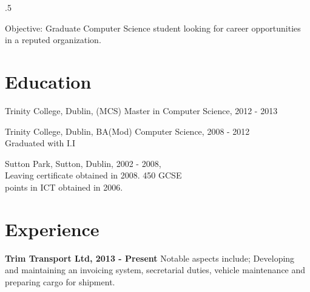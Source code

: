 \documentclass{res}
\begin{document}
 

\thispagestyle{empty} %
\pagestyle{empty}
\address{14 Strand Road\\
Sutton\\
Dublin 13\\
00 353 86 3807768\\
divines@tcd.ie}






\begin{resume}
\vspace{0.1in}
\moveleft.5\sectionwidth\centerline{Objective: Graduate Computer Science student looking for career opportunities in a reputed organization.}  


\section{Education}
\vspace{0.1in} 

    Trinity College, Dublin, (MCS) Master in Computer Science, 2012 - 2013
 
    Trinity College, Dublin, BA(Mod) Computer Science, 2008 - 2012\\ 
    Graduated with I.I
 
    Sutton Park, Sutton, Dublin, 2002 - 2008,\\
    Leaving certificate obtained in 2008. 450 GCSE\\
    points in ICT obtained in 2006.\\
    

\section{Experience} 
\vspace{0.1in}

    {\bf Trim Transport Ltd, 2013 - Present} Notable aspects include; Developing and maintaining an invoicing system, secretarial duties, vehicle maintenance and preparing cargo for shipment.


\end{resume}
\end{document}
